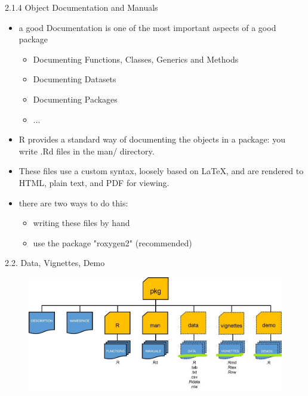 \documentclass[11pt,a4paper]{beamer}
\begin{document}
\begin{frame}[t]{2.1.4 Object Documentation and Manuals}
	
	\begin{itemize}
		\item a good Documentation	is	one	of	the	most	important	aspects	of	a	good package
		\begin{itemize}
			\item Documenting	Functions, 	Classes,	Generics and	Methods
			\item Documenting	Datasets
			\item Documenting	Packages
			\item ...
		\end{itemize}
		
		\item R	provides	a	standard	way	of	documenting	the	objects	in	a	package:	you	write	.Rd	files	in 	the	man/ directory.	
		\item 	These	files	use	a	custom	syntax,	loosely	based	on	LaTeX,	and	are
		rendered	to	HTML,	plain	text,	and	PDF	for	viewing.
		\item there are two ways to do this:
		\begin{itemize}
			\item writing	these	files	by	hand 
			\item use the package "roxygen2" (recommended)
		\end{itemize}
		
		
	\end{itemize}
	
\end{frame}











\begin{frame}[t]{2.2. Data, Vignettes, Demo}
	
	
	\begin{figure}
		\centering
		\includegraphics[width=0.9\linewidth]{opt}
		\label{fig:packages}
	\end{figure}
	
	
\end{frame}
\end{document}
